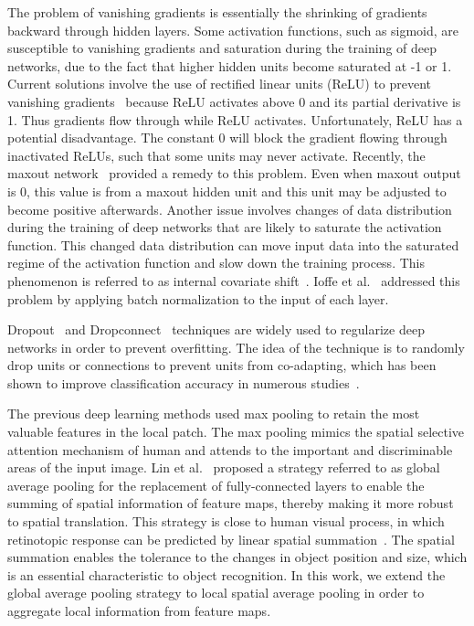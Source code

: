 \documentclass[10pt,twocolumn,letterpaper]{article}
\begin{document}
The problem of vanishing gradients is essentially the shrinking of gradients backward through hidden layers. Some activation functions, such as sigmoid, are susceptible to vanishing gradients and saturation during the training of deep networks, due to the fact that higher hidden units become saturated at -1 or 1. Current solutions involve the use of rectified linear units (ReLU) to prevent vanishing gradients~\cite{krizhevsky2012imagenet,maas2013rectifier,nair2010rectified} because ReLU activates above 0 and its partial derivative is 1. Thus gradients flow through while ReLU activates. Unfortunately, ReLU has a potential disadvantage. The constant 0 will block the gradient flowing through inactivated ReLUs, such that some units may never activate. Recently, the maxout network~\cite{goodfellow2013maxout} provided a remedy to this problem. Even when maxout output is 0, this value is from a maxout hidden unit and this unit may be adjusted to become positive afterwards. Another issue involves changes of data distribution during the training of deep networks that are likely to saturate the activation function. This changed data distribution can move input data into the saturated regime of the activation function and slow down the training process. This phenomenon is referred to as internal covariate shift~\cite{shimodaira2000improving}. Ioffe et al.~\cite{ioffe2015batch} addressed this problem by applying batch normalization to the input of each layer. 

Dropout~\cite{srivastava2014dropout} and Dropconnect~\cite{wan2013regularization} techniques are widely used to regularize deep networks in order to prevent overfitting. The idea of the technique is to randomly drop units or connections to prevent units from co-adapting, which has been shown to improve classification accuracy in numerous studies~\cite{goodfellow2013maxout,lee2014deeply,DBLP:journals/corr/LinCY13,srivastava2014dropout}.

The previous  deep learning methods used max pooling to retain the most valuable features in the local patch. The max pooling mimics the spatial selective attention mechanism of human and attends to the important and discriminable areas of the input image. Lin et al.~\cite{DBLP:journals/corr/LinCY13} proposed a strategy referred to as global average pooling for the replacement of fully-connected layers to enable the summing of spatial information of feature maps, thereby making it more robust to spatial translation. This strategy is close to human visual process, in which retinotopic response can be predicted by linear spatial summation~\cite{hansen2004parametric}. The spatial summation enables the tolerance to the changes in object position and size, which is an essential characteristic to object recognition. In this work, we extend the global average pooling strategy to local spatial average pooling in order to aggregate local information from feature maps. 
\end{document}
